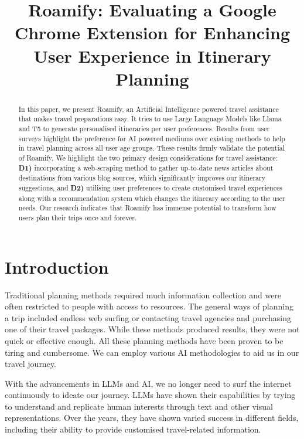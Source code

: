 \documentclass[manuscript,review,anonymous]{acmart}
\title{Roamify: Evaluating a Google Chrome Extension for Enhancing User Experience in Itinerary Planning}
\begin{document}
\begin{abstract}
    In this paper, we present Roamify, an Artificial Intelligence powered travel assistance that makes travel preparations easy. It tries to use Large Language Models like Llama and T5 to generate personalised itineraries per user preferences. Results from user surveys highlight the preference for AI powered mediums over existing methods to help in travel planning across all user age groups. These results firmly validate the potential of Roamify. We highlight the two primary design considerations for travel assistance: \textbf{D1)} incorporating a web-scraping method to gather up-to-date news articles about  destinations from various blog sources, which significantly improves our itinerary suggestions, and \textbf{D2)} utilising user preferences to create customised travel experiences along with a recommendation system which changes the itinerary according to the user needs. Our research indicates that Roamify has immense potential to transform how users plan their trips once and forever.
\end{abstract}



\maketitle

\section{Introduction}
    Traditional planning methods required much information collection and were often restricted to people with access to resources. The general ways of planning a trip included endless web surfing or contacting travel agencies and purchasing one of their travel packages. While these methods produced results, they were not quick or effective enough. All these planning methods have been proven to be tiring and cumbersome. We can employ various AI methodologies to aid us in our travel journey\cite{intro1}.
    
    With the advancements in LLMs and AI, we no longer need to surf the internet continuously to ideate our journey. LLMs have shown their capabilities by trying to understand and replicate human interests through text and other visual representations\cite{intro2}. Over the years, they have shown varied success in different fields, including their ability to provide customised travel-related information.
    
\end{document}
